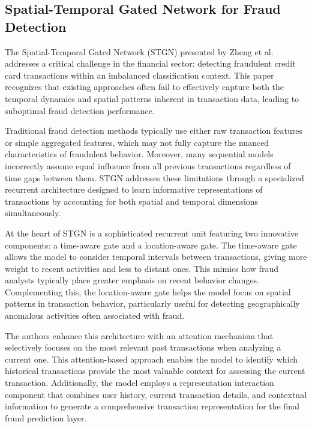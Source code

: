 \documentclass[a4paper, 11pt, twoside, openright]{report}
\begin{document}
\subsection{Spatial-Temporal Gated Network for Fraud Detection}

The Spatial-Temporal Gated Network (STGN) presented by Zheng et al. addresses a critical challenge in the financial sector: detecting fraudulent credit card transactions within an imbalanced classification context. This paper recognizes that existing approaches often fail to effectively capture both the temporal dynamics and spatial patterns inherent in transaction data, leading to suboptimal fraud detection performance.

Traditional fraud detection methods typically use either raw transaction features or simple aggregated features, which may not fully capture the nuanced characteristics of fraudulent behavior. Moreover, many sequential models incorrectly assume equal influence from all previous transactions regardless of time gaps between them. STGN addresses these limitations through a specialized recurrent architecture designed to learn informative representations of transactions by accounting for both spatial and temporal dimensions simultaneously.

At the heart of STGN is a sophisticated recurrent unit featuring two innovative components: a time-aware gate and a location-aware gate. The time-aware gate allows the model to consider temporal intervals between transactions, giving more weight to recent activities and less to distant ones. This mimics how fraud analysts typically place greater emphasis on recent behavior changes. Complementing this, the location-aware gate helps the model focus on spatial patterns in transaction behavior, particularly useful for detecting geographically anomalous activities often associated with fraud.

The authors enhance this architecture with an attention mechanism that selectively focuses on the most relevant past transactions when analyzing a current one. This attention-based approach enables the model to identify which historical transactions provide the most valuable context for assessing the current transaction. Additionally, the model employs a representation interaction component that combines user history, current transaction details, and contextual information to generate a comprehensive transaction representation for the final fraud prediction layer.
\end{document}
